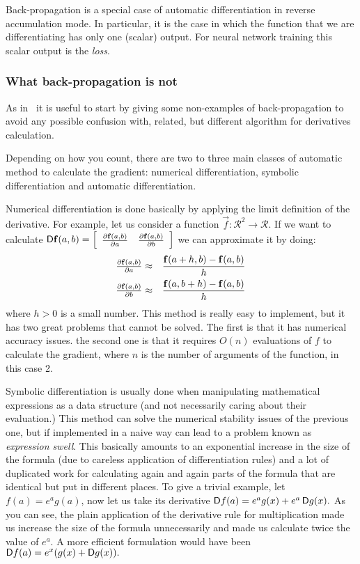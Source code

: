 \documentclass[pdflatex,sn-mathphys-num]{sn-jnl}%
\theoremstyle{thmstyleone}%
\theoremstyle{thmstyletwo}%
\theoremstyle{thmstylethree}%
\begin{document}
Back-propagation is a special case of automatic differentiation in reverse
accumulation mode. In particular, it is the case in which the function that we
are differentiating has only one (scalar) output. For neural network training
this scalar output is the \emph{loss}.

\subsubsection{What back-propagation is not}

As in~\cite{baydin2017} it is useful to start by giving some non-examples of
back-propagation to avoid any possible confusion with, related, but different
algorithm for derivatives calculation.

Depending on how you count, there are two to three main classes of automatic
method to calculate the gradient: numerical differentiation, symbolic
differentiation and automatic differentiation.

Numerical differentiation is done basically by applying the limit definition of
the derivative.  For example, let us consider a function \(\vec f : \mathcal R^2 \to \mathcal R.\)
If  we want to calculate \(\mathop{}\!\mathsf D\mathbf{f}(a,b) =
\left[\begin{array}{cc} \textstyle\frac{\partial\mathbf{f}(a,b)}{\partial a} &
\textstyle\frac{\partial\mathbf{f}(a,b)}{\partial b}\end{array}\right]\) we can approximate it by doing:
\begin{eqnarray*}
    \textstyle\frac{\partial\mathbf{f}(a,b)}{\partial a}
    &\approx& \frac{\mathbf{f}(a + h,b) - \mathbf{f}(a,b)}h \\
    \textstyle\frac{\partial\mathbf{f}(a,b)}{\partial b}
    &\approx& \frac{\mathbf{f}(a,b + h) - \mathbf{f}(a,b)}h
\end{eqnarray*}
where \(h>0\) is a small number. This method is really easy to implement, but it
has two great problems that cannot be solved. The first is that it has numerical
accuracy issues.  the second one is that it requires \(O(n)\) evaluations of
\(f\) to calculate the gradient, where \(n\) is the number of arguments of the
function, in this case 2.

Symbolic differentiation is usually done when manipulating mathematical
expressions as a data structure (and not necessarily caring about their
evaluation.) This method can solve the numerical stability issues of the
previous one, but if implemented in a naive way can lead to a problem known as
\emph{expression swell}. This basically amounts to an exponential increase in
the size of the formula (due to careless application of differentiation rules)
and a lot of duplicated work for calculating again and again parts of the
formula that are identical but put in different places. To give a trivial
example, let \(f(a) = e^a g(a)\), now let us take its derivative \(\mathop{}\!\mathsf D f(a) =
e^a g(x) + e^a \mathop{}\!\mathsf D g(x).\) As you can see, the plain application of the
derivative rule for multiplication made us increase the size of the formula
unnecessarily and made us calculate twice the value of \(e^a\).  A more
efficient formulation would have been \(\mathop{}\!\mathsf D f(a) = e^x (g(x) + \mathop{}\!\mathsf D g(x)).\)
\end{document}
